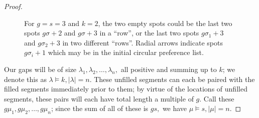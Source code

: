\documentclass[12pt]{article}
\newcommand{\mzncarrot}[4][(0,0)]{
    \begin{scope}[shift={#1}]
    \shade[top color=#2, bottom color=#2, shading angle=90, draw=#2!90!black, rounded corners=0.5ex, thick] (0.5,0.25) -- ++(0,1.5+.25) -- ++(0.5,0.25) -- ++(1.5,0) -- ++(1,-.5) -- ++(0,-1.45) -- cycle;
    \draw[thick, rounded corners=0.2ex, fill=white, thick] (1,2.1) -- ++(0.5,0.45) -- ++(0.8,0) -- ++(0.3,-0.45) -- cycle;
    \draw[thick] (2.1-.25,2.1) -- ++(0,.45);
    \if\relax\detokenize{#3}\relax 
    \else
    \draw[fill=#2!20, thin, draw = #2] (2.1-.25,1.3) circle[radius=.65] 
        node [anchor = center, rotate = #4]{\small #3};
    \fi
    \draw[fill=gray!80,thin] (1.375-.25,.25) circle[radius=.2];
    \draw[fill=gray!80,thin] (2.76-.25,.25) circle[radius=.2];
    \end{scope}
}
\begin{document}
\begin{proof}
\begin{figure}[h]
    
    \caption{For $g = s = 3$ and $k = 2$, the two empty spots could be the last two spots $g\sigma + 2$ and $g\sigma + 3$ in a ``row'', or the last two spots $g\sigma_1 + 3$ and $g\sigma_2 + 3$ in two different ``rows''. Radial arrows indicate spots $g\sigma_i + 1$ which may be in the initial circular preference list.}
    \label{fig:circular}
\end{figure}

    Our gaps will be of size $\lambda_1,\lambda_2,\ldots,\lambda_n,$ all positive and summing up to $k$; we denote this as $\lambda\vDash k,|\lambda|=n.$ These unfilled segments can each be paired with the filled segments immediately prior to them; by virtue of the locations of unfilled segments, these pairs will each have total length a multiple of $g.$ Call these $g\mu_1,g\mu_2,\ldots,g\mu_n$; since the sum of all of these is $gs,$ we have $\mu\vDash s,|\mu|=n.$


\end{proof}
\end{document}

